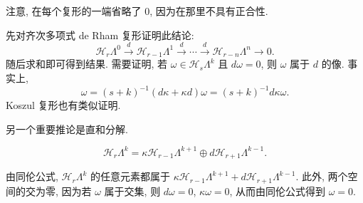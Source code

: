 {注意, 在每个复形的一端省略了 $0$, 因为在那里不具有正合性.}

\begin{Proof}
{先对齐次多项式 de Rham 复形证明此结论:}
\[
\mathcal H_r\Lambda^0\xrightarrow{d}\mathcal H_{r-1}\Lambda^1\xrightarrow{d}\cdots\xrightarrow{d}\mathcal H_{r-n}\Lambda^n\to0.
\]
{随后求和即可得到结果. 需要证明, 若 $\omega\in\mathcal H_s\Lambda^k$ 且 $d\omega=0$, 则 $\omega$ 属于 $d$ 的像. 事实上,}
\[
\omega=(s+k)^{-1}(d\kappa+\kappa d)\omega=(s+k)^{-1}d\kappa\omega.
\]
{Koszul 复形也有类似证明.}
\end{Proof}

{另一个重要推论是直和分解.}


\begin{Corollary}\label{cor:homogeneous-koszul-decomposition}
\begin{equation}\label{eq:homogeneous-koszul-decomposition}
\mathcal H_r\Lambda^k=\kappa\mathcal H_{r-1}\Lambda^{k+1}\oplus d\mathcal H_{r+1}\Lambda^{k-1}.
\end{equation}
\end{Corollary}

\begin{Proof}
{由同伦公式, $\mathcal H_r\Lambda^k$ 的任意元素都属于 $\kappa\mathcal H_{r-1}\Lambda^{k+1}+d\mathcal H_{r+1}\Lambda^{k-1}$. 此外, 两个空间的交为零, 因为若 $\omega$ 属于交集, 则 $d\omega=0$, $\kappa\omega=0$, 从而由同伦公式得到 $\omega=0$.}
\end{Proof}
